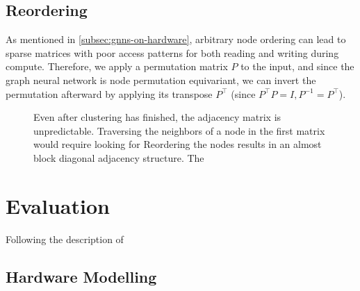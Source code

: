 \documentclass[../main.tex]{subfiles}
\begin{document}
    \subsection{Reordering}\label{subsec:dynamic-reordering}
    As mentioned in \autoref{subsec:gnns-on-hardware}, arbitrary node ordering can lead to sparse matrices with poor access patterns for both reading and writing during compute.
    Therefore, we apply a permutation matrix $P$ to the input, and since the graph neural network is node permutation equivariant, we can invert the permutation afterward by applying its transpose $P^\intercal$ (since $P^\intercal P = I, P^{-1} = P^\intercal$).

    \begin{figure}
        \centering
        
        \caption{Even after clustering has finished, the adjacency matrix is unpredictable.
        Traversing the neighbors of a node in the first matrix would require looking for
        Reordering the nodes results in an almost block diagonal adjacency structure.
        The }
        \label{fig:block-diag-before-after}
    \end{figure}



    \section{Evaluation}\label{sec:evaluation}
    Following the description of

    \subsection{Hardware Modelling}\label{subsec:hardware-modelling}
\end{document}
